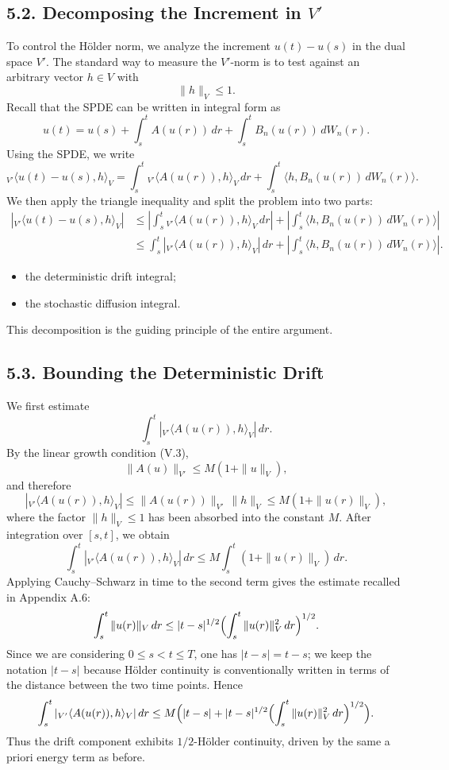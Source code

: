 \documentclass[11pt]{article}
\theoremstyle{definition}
\theoremstyle{remark}
\newcommand{\dual}[2]{{}_{V'}\langle #1, #2 \rangle_{V}}
\begin{document}
\subsection*{5.2. Decomposing the Increment in $V'$}
To control the H\"older norm, we analyze the increment $u(t)-u(s)$ in the dual space $V'$. The standard way to measure the $V'$-norm is to test against an arbitrary vector $h\in V$ with
\[
  \|h\|_V\le 1.
\]
Recall that the SPDE can be written in integral form as
\[
  u(t)
  =
  u(s)
  +
  \int_s^t A(u(r))\,dr
  +
  \int_s^t B_n(u(r))\,dW_n(r).
\]
Using the SPDE, we write
\[
  \dual{u(t)-u(s)}{h}
  =
  \int_s^t \dual{A(u(r))}{h}\,dr
  +
  \int_s^t \langle h,B_n(u(r))\,dW_n(r)\rangle.
\]
We then apply the triangle inequality and split the problem into two parts:
\begin{align*}
  |\dual{u(t)-u(s)}{h}|
  &\le
  \left|
    \int_s^t \dual{A(u(r))}{h}\,dr
  \right|
  +
  \left|
    \int_s^t \langle h,B_n(u(r))\,dW_n(r)\rangle
  \right| \\
  &\le
  \int_s^t |\dual{A(u(r))}{h}|\,dr
  +
  \left|
    \int_s^t \langle h,B_n(u(r))\,dW_n(r)\rangle
  \right|.
\end{align*}
\begin{itemize}
\item the deterministic drift integral;
\item the stochastic diffusion integral.
\end{itemize}
This decomposition is the guiding principle of the entire argument.

\subsection*{5.3. Bounding the Deterministic Drift}
We first estimate
\[
  \int_s^t |\dual{A(u(r))}{h}|\,dr.
\]
By the linear growth condition (V.3),
\[
  \|A(u)\|_{V'}\le M(1+\|u\|_V),
\]
and therefore
\[
  |\dual{A(u(r))}{h}|
  \le
  \|A(u(r))\|_{V'}\,\|h\|_V
  \le
  M(1+\|u(r)\|_V),
\]
where the factor $\|h\|_V\le 1$ has been absorbed into the constant $M$.
After integration over $[s,t]$, we obtain
\[
  \int_s^t |\dual{A(u(r))}{h}|\,dr
  \le
  M\int_s^t (1+\|u(r)\|_V)\,dr.
\]
Applying Cauchy--Schwarz in time to the second term gives the estimate recalled in Appendix A.6:
\[
  \int_s^t \|u(r)\|_V\,dr
  \le
  |t-s|^{1/2}
  \Bigl(\int_s^t \|u(r)\|_V^2\,dr\Bigr)^{1/2}.
\]
Since we are considering $0\le s<t\le T$, one has $|t-s|=t-s$; we keep the notation $|t-s|$ because H\"older continuity is conventionally written in terms of the distance between the two time points.
Hence
\[
  \int_s^t |\dual{A(u(r))}{h}|\,dr
  \le
  M\Bigl(
    |t-s|
    +
    |t-s|^{1/2}
    \Bigl(\int_s^t \|u(r)\|_V^2\,dr\Bigr)^{1/2}
  \Bigr).
\]
Thus the drift component exhibits $1/2$-H\"older continuity, driven by the same a priori energy term as before.
\end{document}
